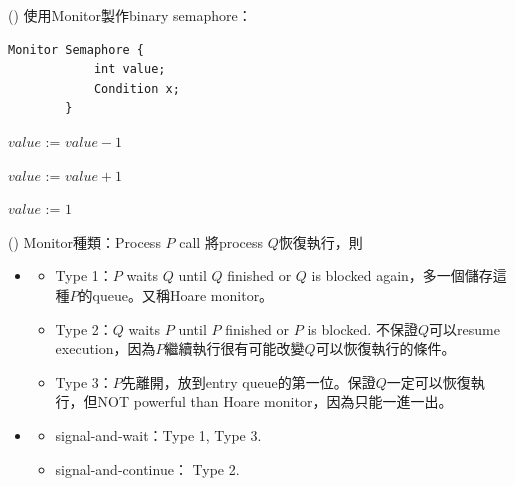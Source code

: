 \begin{theorem}{()} 使用Monitor製作binary semaphore：
    \begin{lstlisting}[caption={Data structure (Making semaphore using monitor).}, captionpos=b, mathescape=true]
        Monitor Semaphore {
            int value;
            Condition x;
        }
    \end{lstlisting}
    \begin{algorithm}[H]
        \caption{$Wait()$.}
        \begin{algorithmic}[1]
                    \State {}
                \EndIf
                \State $value$ := $value - 1$
            \EndFunction
        \end{algorithmic}
    \end{algorithm}
    \begin{algorithm}[H]
        \caption{$Signal()$.}
        \begin{algorithmic}[1]
                \State $value$ := $value + 1$
                \State {}
            \EndFunction
        \end{algorithmic}
    \end{algorithm}
    \begin{algorithm}[H]
        \caption{$initialization\_code()$.}
        \begin{algorithmic}[1]
                \State $value$ := $1$
            \EndFunction
        \end{algorithmic}
    \end{algorithm}
\end{theorem}

\begin{theorem}{()} Monitor種類：Process $P$ call 將process $Q$恢復執行，則\begin{itemize}
        \item \begin{itemize}
            \item Type 1：$P$ waits $Q$ until $Q$ finished or $Q$ is blocked again，多一個儲存這種$P$的queue。又稱Hoare monitor。
            \item Type 2：$Q$ waits $P$ until $P$ finished or $P$ is blocked. 不保證$Q$可以resume execution，因為$P$繼續執行很有可能改變$Q$可以恢復執行的條件。
            \item Type 3：$P$先離開，放到entry queue的第一位。保證$Q$一定可以恢復執行，但NOT powerful than Hoare monitor，因為只能一進一出。
        \end{itemize}
        \item \begin{itemize}
            \item signal-and-wait：Type 1, Type 3.
            \item signal-and-continue： Type 2.
        \end{itemize}
    \end{itemize}
\end{theorem}

